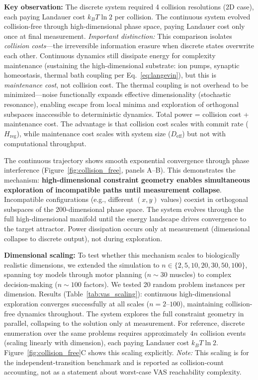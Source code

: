 \documentclass[12pt]{article}
\begin{document}
\textbf{Key observation:} The discrete system required 4 collision resolutions (2D case), each paying Landauer cost $k_B T \ln 2$ per collision. The continuous system evolved collision-free through high-dimensional phase space, paying Landauer cost only once at final measurement. \textit{Important distinction:} This comparison isolates \emph{collision costs}---the irreversible information erasure when discrete states overwrite each other. Continuous dynamics still dissipate energy for complexity maintenance (sustaining the high-dimensional substrate: ion pumps, synaptic homeostasis, thermal bath coupling per Eq.~\ref{eq:langevin}), but this is \emph{maintenance cost}, not collision cost. The thermal coupling is not overhead to be minimized---noise functionally expands effective dimensionality (stochastic resonance), enabling escape from local minima and exploration of orthogonal subspaces inaccessible to deterministic dynamics. Total power = collision cost + maintenance cost. The advantage is that collision cost scales with commit rate ($H_{\text{reg}}$), while maintenance cost scales with system size ($D_{\text{eff}}$) but not with computational throughput.

The continuous trajectory shows smooth exponential convergence through phase interference (Figure~\ref{fig:collision_free}, panels A--B). This demonstrates the mechanism: \textbf{high-dimensional constraint geometry enables simultaneous exploration of incompatible paths until measurement collapse}. Incompatible configurations (e.g., different $(x,y)$ values) coexist in orthogonal subspaces of the 200-dimensional phase space. The system evolves through the full high-dimensional manifold until the energy landscape drives convergence to the target attractor. Power dissipation occurs only at measurement (dimensional collapse to discrete output), not during exploration.

\textbf{Dimensional scaling:} To test whether this mechanism scales to biologically realistic dimensions, we extended the simulation to $n \in \{2, 5, 10, 20, 30, 50, 100\}$, spanning toy models through motor planning ($n \sim 30$ muscles) to complex decision-making ($n \sim 100$ factors). We tested 20 random problem instances per dimension. Results (Table~\ref{tab:vas_scaling}): continuous high-dimensional exploration converges successfully at all scales ($n=2$--$100$), maintaining collision-free dynamics throughout. The system explores the full constraint geometry in parallel, collapsing to the solution only at measurement. For reference, discrete enumeration over the same problems requires approximately $4n$ collision events (scaling linearly with dimension), each paying Landauer cost $k_B T \ln 2$. Figure~\ref{fig:collision_free}C shows this scaling explicitly. \textit{Note:} This scaling is for the independent-transition benchmark and is reported as collision-count accounting, not as a statement about worst-case VAS reachability complexity.
\end{document}
